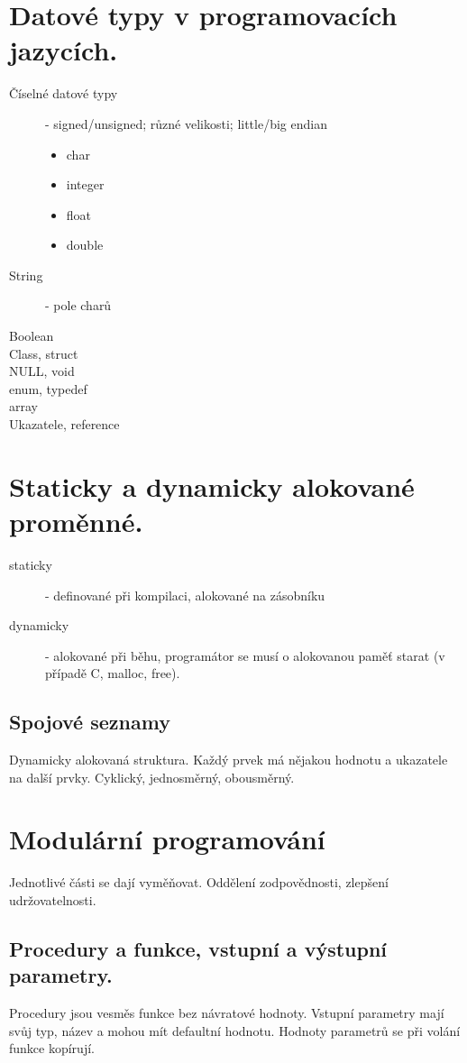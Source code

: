 \documentclass{szzclass}
\begin{document}
\section{Datové typy v programovacích jazycích.}
\begin{description}
  \item[Číselné datové typy] - signed/unsigned; různé velikosti; little/big endian
  \begin{itemize}
    \item char
    \item integer
    \item float
    \item double
  \end{itemize}
  \item[String] - pole charů
  \item[Boolean]
  \item[Class, struct] 
  \item[NULL, void] 
  \item[enum, typedef]
  \item[array]
  \item[Ukazatele, reference]
\end{description}

\section{Staticky a dynamicky alokované proměnné.}
\begin{description}
  \item[staticky] - definované při kompilaci, alokované na zásobníku
  \item[dynamicky] - alokované při běhu, programátor se musí o alokovanou paměť starat (v případě C, malloc, free).
\end{description}

\subsection{Spojové seznamy}
Dynamicky alokovaná struktura. Každý prvek má nějakou hodnotu a ukazatele na další prvky. Cyklický, jednosměrný, obousměrný.

\section{Modulární programování}
Jednotlivé části se dají vyměňovat. Oddělení zodpovědnosti, zlepšení udržovatelnosti.
\subsection{Procedury a funkce, vstupní a výstupní parametry.}
Procedury jsou vesměs funkce bez návratové hodnoty. Vstupní parametry mají svůj typ, název a mohou mít defaultní hodnotu. Hodnoty parametrů se při volání funkce kopírují.
\end{document}
